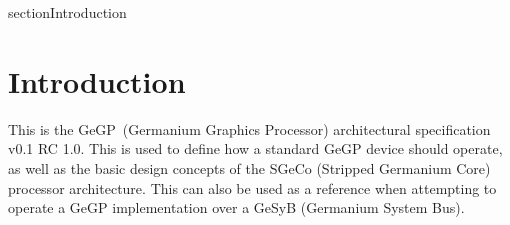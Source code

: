 \documentclass{article}
\title{\name}
\author{Lilly Anderson}
\def\version{0.1 RC 1.0}
\def\name{Germanium Graphics Processor}
\def\sname{GeGP}
\begin{document}
\maketitle

\pagebreak
\tableofcontents

\pagebreak
{}
{section}{Introduction}
\section*{Introduction}
This is the \sname\ (\name) architectural specification v\version. This is used to define how a standard GeGP device should operate, as well as the basic design concepts of the SGeCo (Stripped Germanium Core) processor architecture. This can also be used as a reference when attempting to operate a GeGP implementation over a GeSyB (Germanium System Bus). 
\end{document}
